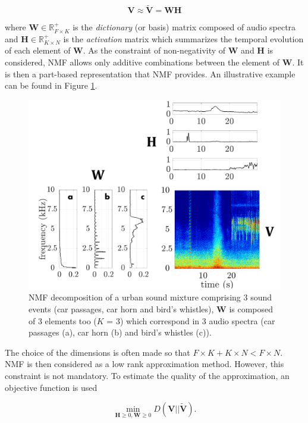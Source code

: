 \documentclass[twocolumn]{svjour3}          %
\begin{document}
\begin{equation}\label{eq:nmf}
\mathbf{V} \approx \mathbf{\tilde{V}} = \mathbf{WH}
\end{equation}

where $\mathbf{W} \in \mathbb{R}^+_{F \times K}$ is the \textit{dictionary} (or basis) matrix composed of audio spectra and $\mathbf{H} \in \mathbb{R}^+_{K \times N}$ is the \textit{activation} matrix which summarizes the temporal evolution of each element of $\mathbf{W}$. As the constraint of non-negativity of $\mathbf{W}$ and $\mathbf{H}$ is considered, NMF allows only additive combinations between the element of $\mathbf{W}$. It is then a part-based representation that NMF provides. An illustrative example can be found in Figure \ref{fig:example_NMF}.

\begin{figure}[t]
\centering
\includegraphics[width=0.9\linewidth]{figures/schema_introduction_nmf.pdf}
\caption{NMF decomposition of a urban sound mixture comprising 3 sound events (car passages, car horn and bird's whistles), $\mathbf{W}$ is composed of 3 elements too ($K$ = 3) which correspond in 3 audio spectra (car passages (a), car horn (b) and bird's whistles (c)).}
\label{fig:example_NMF}
\end{figure}

The choice of the dimensions is often made so that $F\times K + K \times N < F \times N$. NMF is then considered as a low rank approximation method. However, this constraint is not mandatory. To estimate the quality of the approximation, an objective function is used

\begin{equation}\label{eq:min-D-WH}
\underset{\mathbf{H} \geq 0, \mathbf{W} \geq 0}{\min} D\left(\mathbf{V} \vert \vert \mathbf{\tilde{V}}\right).
\end{equation}
\end{document}
